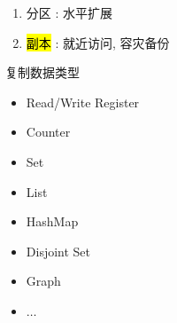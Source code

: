 \begin{frame}{}
  \graphicspath{{tikz/}}
  \begin{figure}[h!]
    \centering
    \begin{adjustbox}{max totalsize = {0.50\textwidth}{1.00\textheight}, center}
      
    \end{adjustbox}
  \end{figure}

  \vspace{0.20cm}
  \begin{center}
    \begin{minipage}{0.65\textwidth}

      \vspace{0.20cm}
      \begin{enumerate}
	\item<2-> 分区 : 水平扩展
	\item<3-> \hl{副本 }: 就近访问, 容灾备份
      \end{enumerate}
    \end{minipage}
  \end{center}
\end{frame}

\begin{frame}{}
  \begin{center}
    \begin{minipage}{0.50\textwidth}
      {\large 复制数据类型}  

      \vspace{0.20cm}
      \begin{itemize}
	\setlength{\itemsep}{4pt}
	\item Read/Write Register
	\item Counter
	\item Set
	\item List
	\item HashMap
	\item Disjoint Set
	\item Graph
	\item $\dots$
      \end{itemize}
    \end{minipage}
  \end{center}
\end{frame}

\begin{frame}{}
  \begin{columns}
      \centerline{\hl{}}
  \end{columns}

  \pause
  \vspace{0.30cm}
  \centerline{}
\end{frame}

\begin{frame}{}
  \begin{center}
    \resizebox{0.65\textwidth}{!}{}
  \end{center}
\end{frame}
